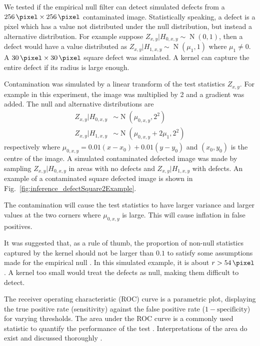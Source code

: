 \documentclass{article}
\DeclareMathOperator{\normal}{N}
\begin{document}
We tested if the empirical null filter can detect simulated defects from a $\SI{256}{\pixel}\times \SI{256}{\pixel}$ contaminated image. Statistically speaking, a defect is a pixel which has a value not distributed under the null distribution, but instead a alternative distribution. For example suppose $Z_{x,y}|H_{0,x,y}\sim\normal(0,1)$, then a defect would have a value distributed as $Z_{x,y}|H_{1,x,y}\sim\normal(\mu_{1},1)$ where $\mu_1\neq0$. A $\SI{30}{\pixel}\times \SI{30}{\pixel}$ square defect was simulated. A kernel can capture the entire defect if its radius is large enough.

Contamination was simulated by a linear transform of the test statistics $Z_{x,y}$. For example in this experiment, the image was multiplied by 2 and a gradient was added. The null and alternative distributions are
\begin{align}
  Z_{x,y}|H_{0,x,y}&\sim\normal(\mu_{0,x,y},2^2)
  \\
  Z_{x,y}|H_{1,x,y}&\sim\normal(\mu_{0,x,y}+2\mu_1,2^2)
\end{align}
respectively where $\mu_{0,x,y}=0.01(x-x_0)+0.01(y-y_0)$ and $(x_0,y_0)$ is the centre of the image. A simulated contaminated defected image was made by sampling $Z_{x,y}|H_{0,x,y}$ in areas with no defects and $Z_{x,y}|H_{1,x,y}$ with defects. An example of a contaminated square defected image is shown in Fig.~\ref{fig:inference_defectSquare2Example}.

The contamination will cause the test statistics to have larger variance and larger values at the two corners where $\mu_{0,x,y}$ is large. This will cause inflation in false positives.

It was suggested that, as a rule of thumb, the proportion of non-null statistics captured by the kernel should not be larger than $0.1$ to satisfy some assumptions made for the empirical null \citep{efron2004large, schwartzman2008empirical}. In this simulated example, it is about $r>\SI{54}{\pixel}$. A kernel too small would treat the defects as null, making them difficult to detect.

The receiver operating characteristic (ROC) curve \citep{cook2007use, friedman2001elements, green1966signal, hanley1982meaning, metz1978basic} is a parametric plot, displaying the true positive rate (sensitivity) against the false positive rate ($1-\text{specificity}$) for varying thresholds. The area under the ROC curve is a commonly used statistic to quantify the performance of the test \citep{friedman2001elements}. Interpretations of the area do exist \citep{hanley1982meaning, metz1978basic} and discussed thoroughly \citep{cook2007use}.
\end{document}
